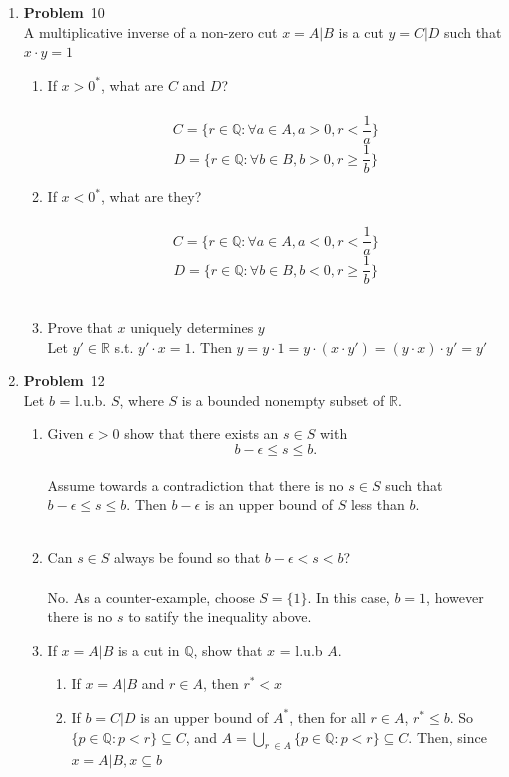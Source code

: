 \documentclass[12pt]{amsart}
\newcommand{\benu}{\begin{enumerate}}
\newcommand{\eenu}{\end{enumerate}}
\theoremstyle{definition}
\newcommand{\mbR}{\mathbb{R}}
\newcommand{\mbQ}{\mathbb{Q}}
\newcommand{\itep}{\item {\bfseries Problem}\ }
\begin{document}
\begin{enumerate}[series=p]
\newpage
\itep 10\\
A multiplicative inverse of a non-zero cut $x = A|B$ is a cut $y = C|D$ such that $x \cdot y = 1$
\benu
\item If $x > 0^*$, what are $C$ and $D$?\\
\\
$$C = \{r \in \mbQ : \forall a \in A, a > 0, r < \frac{1}{a}\}$$
$$D = \{r \in \mbQ : \forall b \in B, b > 0, r \geq \frac{1}{b}\}$$
\item If $x < 0^*$, what are they?\\
\\
$$C = \{r \in \mbQ : \forall a \in A, a < 0, r < \frac{1}{a}\}$$
$$D = \{r \in \mbQ : \forall b \in B, b < 0, r \geq \frac{1}{b}\}$$
\\
\item Prove that $x$ uniquely determines $y$
\\
Let $y' \in \mbR$ s.t. $y' \cdot x = 1$.  Then $y = y \cdot 1 = y \cdot (x \cdot y') = (y \cdot x) \cdot y' = y' $
\\
\eenu

\newpage
\itep 12\\
Let $b$ = l.u.b. $S$, where $S$ is a bounded nonempty subset  of $\mbR$.
\benu
\item Given $\epsilon > 0$ show that there exists an $s \in S$ with
$$b - \epsilon \leq s \leq b.$$
\\
Assume towards a contradiction that there is no $s \in S$ such that $b - \epsilon \leq s \leq b$.  Then $b - \epsilon$ is an upper bound of $S$ less than $b$.\hfill \lightning
\\
\\
\item Can $s \in S$ always be found so that $b - \epsilon < s < b$?
\\\\
No.  As a counter-example, choose $S = \{ 1 \}$.  In this case, $b = 1$, however there is no $s$ to satify the inequality above.
\\
\item If $x = A|B$ is a cut in $\mbQ$, show that $x$ = l.u.b $A$.
\\
\benu
\item If $x = A|B$ and $r \in A$, then $r^* < x$
\item If $b = C|D$ is an upper bound of $A^*$, then for all $r \in A$, $r^* \leq b$.  So $\{p \in \mbQ: p < r \} \subseteq C$, and $A = \bigcup\limits_{r \ \in A} \{p \in \mbQ : p < r \} \subseteq C$.  Then, since $x = A|B, x \subseteq b$
\eenu
\eenu


\end{enumerate}
\end{document}
